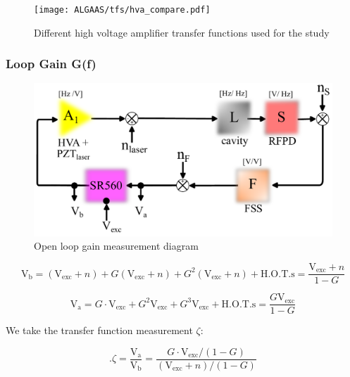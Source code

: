 \begin{figure}[H]
    \centering
    \texttt{[image: ALGAAS/tfs/hva\_compare.pdf]}
    \caption{Different high voltage amplifier transfer functions used for the study}
    \label{fig:hvacompare}
\end{figure}

\subsubsection{Loop Gain G(f)}
\begin{figure}[H]
  \begin{center}
    \includegraphics[width=\textwidth]{figs/ALGAAS/olg_meas_diagram.pdf}
    \caption{Open loop gain measurement diagram}
  \end{center}
  \label{fig:OLGmath}
\end{figure}

\begin{equation}
    \mathrm{V}_\mathrm{b} = (\mathrm{V}_\mathrm{exc}+n) + G(\mathrm{V}_\mathrm{exc}+n) + G^2 (\mathrm{V}_\mathrm{exc}+n) + \mathrm{H.O.T.s} = \frac{\mathrm{V}_\mathrm{exc} + n}{1-G}
\end{equation}

\begin{equation}
    \mathrm{V}_\mathrm{a} = G\cdot \mathrm{V}_\mathrm{exc} + G^2\mathrm{V}_\mathrm{exc} + G^3\mathrm{V}_\mathrm{exc} + \mathrm{H.O.T.s}  = \frac{G\mathrm{V}_\mathrm{exc}}{1-G}
\end{equation}

We take the transfer function measurement $\zeta$:

\begin{equation}.
    \zeta = \frac{\mathrm{V}_\mathrm{a}}{\mathrm{V}_\mathrm{b}} = \frac{G \cdot \mathrm{V}_\mathrm{exc}/(1-G)}{(\mathrm{V}_\mathrm{exc}+n)/(1-G)}
\end{equation}


